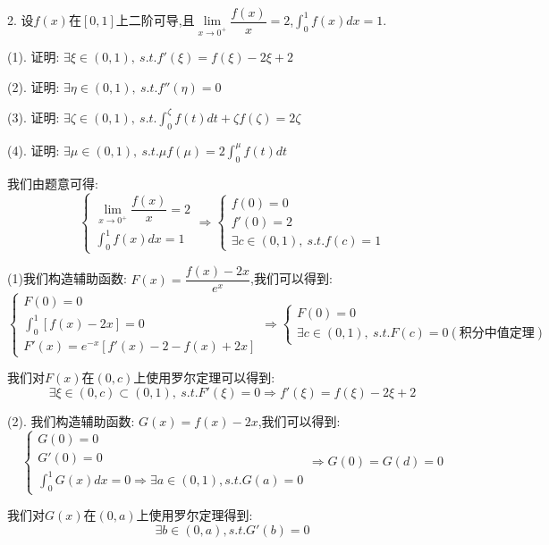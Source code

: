 2. 设$f(x)$在$[0,1]$上二阶可导,且$\lim\limits_{x\rightarrow 0^{+}}\dfrac{f(x)}{x}=2$,$\int_{0}^{1}f(x)dx=1$.

(1). 证明:  $\exists \xi\in(0,1),\ s.t. f'(\xi)=f(\xi)-2\xi+2$

(2). 证明:  $\exists \eta\in(0,1),\ s.t. f''(\eta)=0$

(3). 证明:  $\exists \zeta\in(0,1),\ s.t. \int_{0}^{\zeta}f(t)dt+\zeta f(\zeta)=2\zeta$

(4). 证明:  $\exists \mu\in(0,1),\ s.t. \mu f(\mu)=2\int_{0}^{\mu}f(t)dt$
\begin{solution}

	我们由题意可得:  
	$$\left\lbrace
	\begin{array}{l}
		\lim\limits_{x\rightarrow 0^{+}}\dfrac{f(x)}{x}=2\\
		\int_{0}^{1}f(x)dx=1
	\end{array}
	\right. \Rightarrow \left\lbrace
	\begin{array}{l}
		f(0)=0\\
		f'(0)=2\\
		\exists c\in(0,1),\ s.t. f(c)=1
	\end{array}
	\right. $$
	
	(1)我们构造辅助函数:  $F(x)=\dfrac{f(x)-2x}{e^x}$,我们可以得到:  
	$$\left\lbrace
	\begin{array}{l}
		F(0)=0\\
		\int_{0}^{1}[f(x)-2x]=0\\
		F'(x)=e^{-x}[f'(x)-2-f(x)+2x]
	\end{array}
	\right. \Rightarrow \left\lbrace
	\begin{array}{l}
		F(0)=0\\
		\exists c\in(0,1),\ s.t. F(c)=0(\text{积分中值定理})
	\end{array}
	\right. $$
	
	我们对$F(x)$在$(0,c)$上使用罗尔定理可以得到:  
	$$\exists \xi\in(0,c)\subset(0,1),\ s.t. F'(\xi)=0\Rightarrow f'(\xi)=f(\xi)-2\xi+2$$
	
	(2). 我们构造辅助函数:  $G(x)=f(x)-2x$,我们可以得到:  
	$$\left\lbrace
	\begin{array}{l}
		G(0)=0\\
		G'(0)=0\\
		\int_{0}^{1}G(x)dx=0\Rightarrow \exists a\in(0,1),s.t. G(a)=0
	\end{array}
	\right. \Rightarrow G(0)=G(d)=0$$
	
	我们对$G(x)$在$(0,a)$上使用罗尔定理得到:  
	$$\exists b\in(0,a),s.t. G'(b)=0$$
	

\end{solution}
